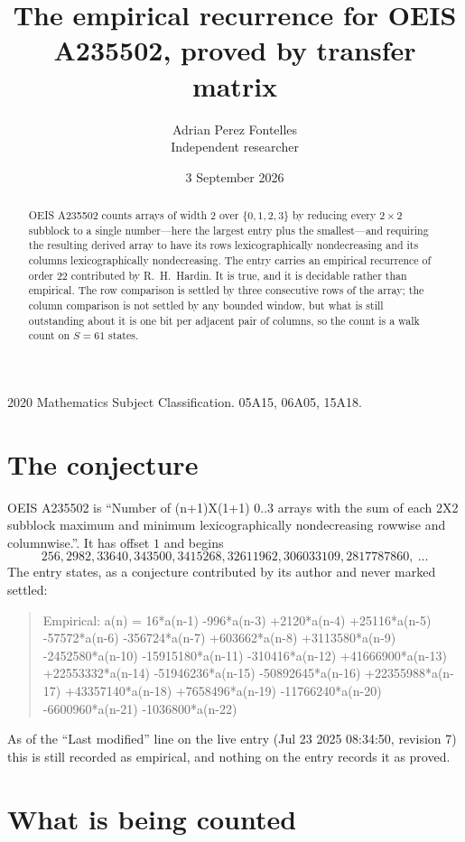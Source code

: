 \documentclass[11pt,a4paper]{article}
\title{The empirical recurrence for OEIS A235502, proved by transfer matrix}
\author{Adrian Perez Fontelles\\ \small Independent researcher}
\date{3 September 2026}
\theoremstyle{plain}
\theoremstyle{definition}
\begin{document}
\maketitle

\begin{abstract}
OEIS A235502 counts arrays of width $2$ over $\{0,1,2,3\}$ by reducing every $2\times2$ subblock to a
single number---here the largest entry plus the smallest---and requiring the resulting derived array to have its rows
lexicographically nondecreasing and its columns lexicographically nondecreasing. The entry carries an
empirical recurrence of order $22$ contributed by R.~H.~Hardin. It is true, and it is
decidable rather than empirical. The row comparison is settled by three consecutive rows of the
array; the column comparison is not settled by any bounded window, but what is still outstanding
about it is one bit per adjacent pair of columns, so the count is a walk count on $S=61$
states.
\end{abstract}

\noindent\small 2020 Mathematics Subject Classification. 05A15, 06A05, 15A18.\normalsize

\section{The conjecture}

OEIS A235502 is ``Number of (n+1)X(1+1) 0..3 arrays with the sum of each 2X2 subblock maximum and minimum lexicographically nondecreasing rowwise and columnwise.''. It has offset $1$ and begins
\[
256, 2982, 33640, 343500, 3415268, 32611962, 306033109, 2817787860,\ \dots
\]
The entry states, as a conjecture contributed by its author and never marked settled:
\begin{quote}
Empirical: a(n) = 16*a(n-1) -996*a(n-3) +2120*a(n-4) +25116*a(n-5) -57572*a(n-6) -356724*a(n-7) +603662*a(n-8) +3113580*a(n-9) -2452580*a(n-10) -15915180*a(n-11) -310416*a(n-12) +41666900*a(n-13) +22553332*a(n-14) -51946236*a(n-15) -50892645*a(n-16) +22355988*a(n-17) +43357140*a(n-18) +7658496*a(n-19) -11766240*a(n-20) -6600960*a(n-21) -1036800*a(n-22)
\end{quote}
As of the ``Last modified'' line on the live entry (Jul 23 2025 08:34:50, revision 7) this is still
recorded as empirical, and nothing on the entry records it as proved.

\section{What is being counted}
\end{document}
